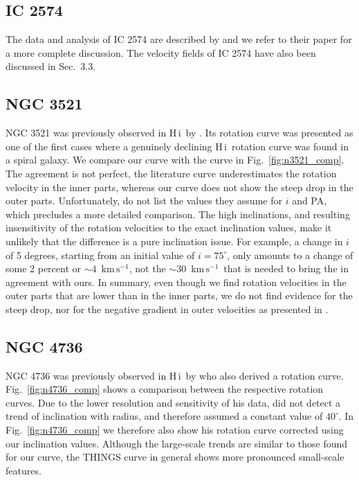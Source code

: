 \documentclass[usenatbib,usegraphicx,apjfonts,floatfix]{emulateapj}
\newcommand{\kms}{\ensuremath{\,\mbox{km}\,\mbox{s}^{-1}}}
\newcommand{\HI}{H\,{\sc i}}
\begin{document}
\subsection{IC 2574}

The data and analysis of IC 2574 are described by \citet{oh2007} and
we refer to their paper for a more complete discussion. The velocity
fields of IC 2574 have also been discussed in Sec.~3.3.

\subsection{NGC 3521}

NGC 3521 was previously observed in \HI\ by \citet{cas_vg91}. Its
rotation curve was presented as one of the first cases where a
genuinely declining \HI\ rotation curve was found in a spiral galaxy.
We compare our curve with the \citet{cas_vg91} curve in
Fig.~\ref{fig:n3521_comp}.  The agreement is not perfect, the
literature curve underestimates the rotation velocity in the inner
parts, whereas our curve does not show the steep drop in the outer
parts.  Unfortunately, \citet{cas_vg91} do not list the values they
assume for $i$ and PA, which precludes a more detailed comparison.
The high inclinations, and resulting insensitivity of the rotation
velocities to the exact inclination values, make it unlikely that the
difference is a pure inclination issue.  For example, a change in $i$
of 5 degrees, starting from an initial value of $i = 75^{\circ}$, only
amounts to a change of some 2 percent or $\sim 4$ \kms, not the $\sim
30$ \kms\ that is needed to bring the \citet{cas_vg91} in agreement
with ours. In summary, even though we find rotation velocities in the
outer parts that are lower than in the inner parts, we do not find
evidence for the steep drop, nor for the negative gradient in 
outer velocities as presented in \citet{cas_vg91}.


\subsection{NGC 4736}

NGC 4736 was previously observed in \HI\ by \citet{mulder} who also
derived a rotation curve. Fig.\ \ref{fig:n4736_comp} shows a
comparison between the respective rotation curves.  Due to the lower
resolution and sensitivity of his data, \citet{mulder} did not
detect a trend of inclination with radius, and therefore assumed a
constant value of $40^{\circ}$. In Fig.\ \ref{fig:n4736_comp} we
therefore also show his rotation curve corrected using our inclination
values. Although the large-scale trends are similar to those found for
our curve, the THINGS curve in general shows more pronounced
small-scale features.
\end{document}
